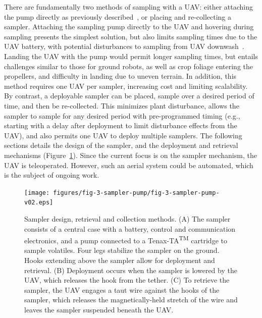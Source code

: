 There are fundamentally two methods of sampling with a UAV: either attaching the pump directly as previously described~\cite{mckinney_sampler_2019}, or placing and re-collecting a sampler. Attaching the sampling pump directly to the UAV and hovering during sampling presents the simplest solution, but also limits sampling times due to the UAV battery, with potential disturbances to sampling from UAV downwash~\cite{mckinney_sampler_2019}. Landing the UAV with the pump would permit longer sampling times, but entails challenges similar to those for ground robots, as well as crop foliage entering the propellers, and difficulty in landing due to uneven terrain. In addition, this method requires one UAV per sampler, increasing cost and limiting scalability.
By contrast, a deployable sampler can be placed, sample over a desired period of time, and then be re-collected. This minimizes plant disturbance, allows the sampler to sample for any desired period with pre-programmed timing (e.g., starting with a delay after deployment to limit disturbance effects from the UAV), and also permits one UAV to deploy multiple samplers. The following sections details the design of the sampler, and the deployment and retrieval mechanisms (Figure~\ref{fig-3-pump-collection}). Since the current focus is on the sampler mechanism, the UAV is teleoperated. However, such an aerial system could be automated, which is the subject of ongoing work.

\begin{figure}[!t]
\centering
\texttt{[image: figures/fig-3-sampler-pump/fig-3-sampler-pump-v02.eps]}
\caption{Sampler design, retrieval and collection methods. (A) The sampler consists of a central case with a battery, control and communication electronics, and a pump connected to a Tenax-TA\textsuperscript{TM} cartridge to sample volatiles. Four legs stabilize the sampler on the ground. Hooks extending above the sampler allow for deployment and retrieval. (B) Deployment occurs when the sampler is lowered by the UAV, which releases the hook from the tether. (C) To retrieve the sampler, the UAV engages a taut wire against the hooks of the sampler, which releases the magnetically-held stretch of the wire and leaves the sampler suspended beneath the UAV. }
\label{fig-3-pump-collection}
\end{figure}

